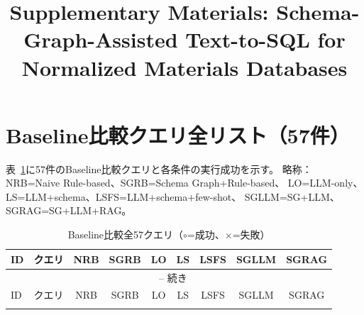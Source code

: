 \documentclass[3p]{elsarticle}
\begin{document}
\begin{frontmatter}
\title{Supplementary Materials: Schema-Graph-Assisted Text-to-SQL for Normalized Materials Databases}
\end{frontmatter}

\tableofcontents
\newpage


\section{Baseline比較クエリ全リスト（57件）}
\label{sup:baseline}

表~\ref{tab:baseline_full}に57件のBaseline比較クエリと各条件の実行成功を示す。
略称：NRB=Naive Rule-based、SGRB=Schema Graph+Rule-based、
LO=LLM-only、LS=LLM+schema、LSFS=LLM+schema+few-shot、
SGLLM=SG+LLM、SGRAG=SG+LLM+RAG。

\begin{longtable}{lp{5cm}ccccccc}
\caption{Baseline比較全57クエリ（$\circ$=成功、$\times$=失敗）}
\label{tab:baseline_full} \\
\toprule
ID & クエリ & NRB & SGRB & LO & LS & LSFS & SGLLM & SGRAG \\
\midrule
\endfirsthead
\multicolumn{9}{c}{\tablename~\thetable{} -- 続き} \\
\toprule
ID & クエリ & NRB & SGRB & LO & LS & LSFS & SGLLM & SGRAG \\
\midrule
\endhead
\bottomrule
\endfoot


\end{longtable}
\end{document}
